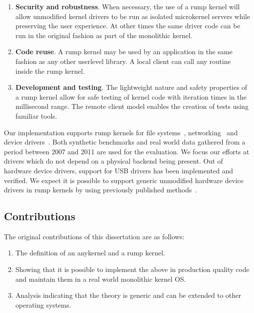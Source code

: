 \begin{enumerate}
\item   \textbf{Security and robustness}.
	When necessary, the use of a rump kernel will allow unmodified
	kernel drivers to be run as isolated microkernel servers
	while preserving the user experience.  At other times the
	same driver code can be run in the original fashion as part
	of the monolithic kernel.

\item	\textbf{Code reuse}.  A rump kernel may be used by an
	application in the same fashion as any other userlevel
	library.  A local client can call any routine inside the
	rump kernel.

\item	\textbf{Development and testing}.  The lightweight nature
	and safety properties of a rump kernel allow for safe testing
	of kernel code with iteration times in the millisecond range.
	The remote client model enables the creation of tests using
	familiar tools.
\end{enumerate}

Our implementation supports rump kernels for
file systems~\cite{kantee:rumpfs}, networking~\cite{kantee:rumpnet}
and device drivers~\cite{kantee:rumpdev}.
Both synthetic benchmarks and real world data gathered from a period
between 2007 and 2011 are used for the evaluation.  We focus our efforts
at drivers which do not depend on a physical backend being present.  Out
of hardware device drivers, support for USB drivers has been implemented
and verified.  We expect it is possible to support generic unmodified
hardware device drivers in rump kernels by using previously published
methods~\cite{levasseur:driverreuse}.

\subsection{Contributions}

The original contributions of this dissertation are as follows:

\begin{enumerate}
\item	The definition of an anykernel and a rump kernel.

\item   Showing that it is possible to implement the above in
	production quality code and maintain them in a real world
	monolithic kernel OS.

\item   Analysis indicating that the theory is generic and can be
	extended to other operating systems.
\end{enumerate}

